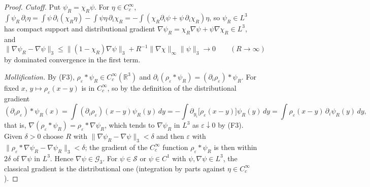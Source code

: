 \documentclass[11pt]{article}
\theoremstyle{definition}
\theoremstyle{plain}
\newcommand{\R}{\mathbb R}
\newcommand{\norm}[1]{\lVert #1\rVert}
\begin{document}
\begin{proof}
\emph{Cutoff.}  Put $\psi_R=\chi_R\psi$.  For $\eta\in C_c^\infty$,
$\int\psi_R\,\partial_i\eta=\int\psi\,\partial_i(\chi_R\eta)
-\int\psi\eta\,\partial_i\chi_R
=-\int(\chi_R\partial_i\psi+\psi\,\partial_i\chi_R)\eta$,
so $\psi_R\in L^3$ has compact support and distributional gradient
$\nabla\psi_R=\chi_R\nabla\psi+\psi\nabla\chi_R\in L^3$, and
\[
 \norm{\nabla\psi_R-\nabla\psi}_3
 \le\norm{(1-\chi_R)\nabla\psi}_3+R^{-1}\norm{\nabla\chi}_\infty\norm\psi_3
 \longrightarrow0\qquad(R\to\infty)
\]
by dominated convergence in the first term.

\emph{Mollification.}  By (F3), $\rho_\varepsilon*\psi_R\in C_c^\infty(\R^3)$
and $\partial_i(\rho_\varepsilon*\psi_R)=(\partial_i\rho_\varepsilon)*\psi_R$.
For fixed $x$, $y\mapsto\rho_\varepsilon(x-y)$ is in $C_c^\infty$, so by
the definition of the distributional gradient
\[
 (\partial_i\rho_\varepsilon)*\psi_R(x)
 =\int(\partial_i\rho_\varepsilon)(x-y)\psi_R(y)\,dy
 =-\int\partial_{y_i}\bigl[\rho_\varepsilon(x-y)\bigr]\psi_R(y)\,dy
 =\int\rho_\varepsilon(x-y)\,\partial_i\psi_R(y)\,dy ,
\]
that is, $\nabla(\rho_\varepsilon*\psi_R)=\rho_\varepsilon*\nabla\psi_R$,
which tends to $\nabla\psi_R$ in $L^3$ as $\varepsilon\downarrow0$ by (F3).
Given $\delta>0$ choose $R$ with $\norm{\nabla\psi_R-\nabla\psi}_3<\delta$
and then $\varepsilon$ with
$\norm{\rho_\varepsilon*\nabla\psi_R-\nabla\psi_R}_3<\delta$; the
gradient of the $C_c^\infty$ function $\rho_\varepsilon*\psi_R$ is then
within $2\delta$ of $\nabla\psi$ in $L^3$.  Hence
$\nabla\psi\in\mathcal G_3$.  For $\psi\in\mathcal S$ or
$\psi\in C^1$ with $\psi,\nabla\psi\in L^3$, the classical gradient is the
distributional one (integration by parts against $\eta\in C_c^\infty$).
\end{proof}
\end{document}
